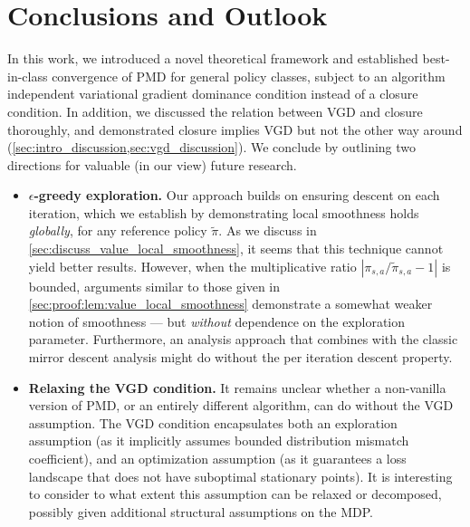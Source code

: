 \section{Conclusions and Outlook}
In this work, we introduced a novel theoretical framework and established best-in-class convergence of PMD for general policy classes, subject to an algorithm independent variational gradient dominance condition instead of a closure condition. In addition, we discussed the relation between VGD and closure thoroughly, and demonstrated closure implies VGD but not the other way around (\cref{sec:intro_discussion,sec:vgd_discussion}).
We conclude by outlining two directions for valuable (in our view) future research.
\begin{itemize}
    \item \textbf{$\epsilon$-greedy exploration.} Our approach builds on ensuring descent on each iteration, 
    which we establish by demonstrating local smoothness holds \emph{globally}, for any reference policy $\tilde \pi$. 
    As we discuss in \cref{sec:discuss_value_local_smoothness}, it seems that this technique cannot yield better results. However, when the multiplicative ratio $|\pi_{s,a}/ \tilde \pi_{s,a}-1|$ is bounded, arguments similar to those given in \cref{sec:proof:lem:value_local_smoothness} demonstrate a somewhat weaker notion of smoothness --- but \emph{without} dependence on the exploration parameter.
    Furthermore, an analysis approach that combines with the classic mirror descent analysis might do without the per iteration descent property.
    
    \item \textbf{Relaxing the VGD condition.} 
    It remains unclear whether a non-vanilla version of PMD, or an entirely different algorithm, can do without the VGD assumption. The VGD condition encapsulates both an exploration assumption (as it implicitly assumes bounded distribution mismatch coefficient), and an optimization assumption (as it guarantees a loss landscape that does not have suboptimal stationary points). It is interesting to consider to what extent this assumption can be relaxed or decomposed, possibly given additional structural assumptions on the MDP.
    
\end{itemize}


